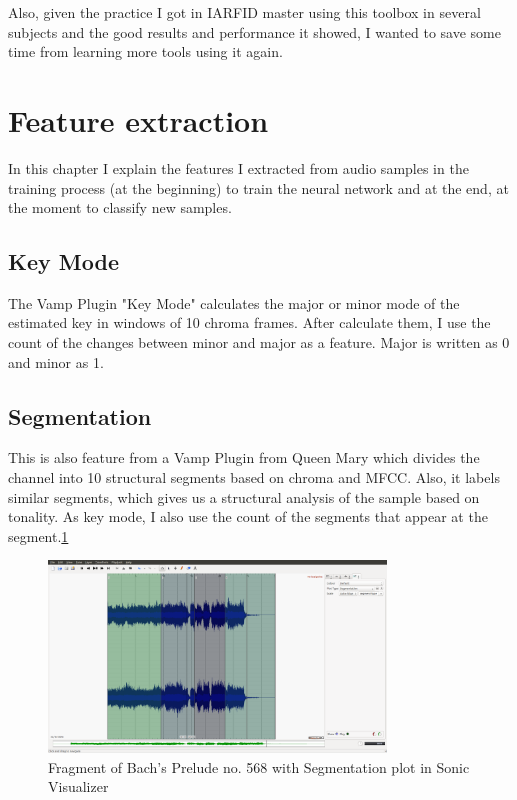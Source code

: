 \documentclass[a4paper,openany,oneside,12pt]{book}
\begin{document}
Also, given the practice I got in IARFID master using this toolbox in several subjects and the good results and performance it showed, I wanted to save some time from learning more tools using it again.



\section{Feature extraction}\label{sec:feature_extraction}
In this chapter I explain the features I extracted from audio samples in the training process (at the beginning) to train the neural network and at the end, at the moment to classify new samples.


\subsection{Key Mode}\label{subsec:keymode}
The Vamp Plugin "Key Mode" calculates the major or minor mode of the estimated key in windows of 10 chroma frames. After calculate them, I use the count of the changes between minor and major as a feature. Major is written as 0 and minor as 1.

\subsection{Segmentation}\label{subsec:segmentation}
This is also feature from a Vamp Plugin from Queen Mary which divides the channel into 10 structural segments based on chroma and MFCC. Also, it labels similar segments, which gives us a structural analysis of the sample based on tonality. As key mode, I also use the count of the segments that appear at the segment.\ref{fig:sonic}

\begin{figure}
\centering
\includegraphics[width=0.8\textwidth]{img/segmentation.png} 
\caption{Fragment of Bach's Prelude no. 568 with Segmentation plot in Sonic Visualizer} \label{fig:sonic}
\end{figure}
\end{document}
